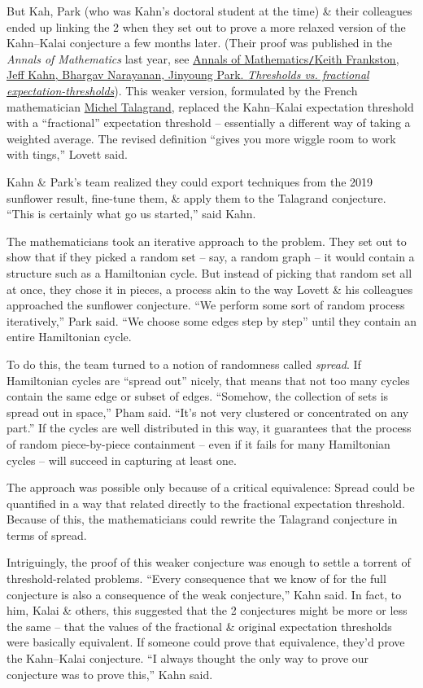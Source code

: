 \documentclass[oneside]{book}
\numberwithin{equation}{section}
\begin{document}
But Kah, Park (who was Kahn's doctoral student at the time) \& their colleagues ended up linking the 2 when they set out to prove a more relaxed version of the Kahn--Kalai conjecture a few months later. (Their proof was published in the \textit{Annals of Mathematics} last year, see \href{https://annals.math.princeton.edu/2021/194-2/p02}{Annals of Mathematics\texttt{/}Keith Frankston, Jeff Kahn, Bhargav Narayanan, Jinyoung Park. \textit{Thresholds vs. fractional expectation-thresholds}}). This weaker version, formulated by the French mathematician \href{https://michel.talagrand.net/}{Michel Talagrand}, replaced the Kahn--Kalai expectation threshold with a ``fractional'' expectation threshold -- essentially a different way of taking a weighted average. The revised definition ``gives you more wiggle room to work with tings,'' Lovett said.

Kahn \& Park's team realized they could export techniques from the 2019 sunflower result, fine-tune them, \& apply them to the Talagrand conjecture. ``This is certainly what go us started,'' said Kahn.

The mathematicians took an iterative approach to the problem. They set out to show that if they picked a random set -- say, a random graph -- it would contain a structure such as a Hamiltonian cycle. But instead of picking that random set all at once, they chose it in pieces, a process akin to the way Lovett \& his colleagues approached the sunflower conjecture. ``We perform some sort of random process iteratively,'' Park said. ``We choose some edges step by step'' until they contain an entire Hamiltonian cycle.

To do this, the team turned to a notion of randomness called \textit{spread}. If Hamiltonian cycles are ``spread out'' nicely, that means that not too many cycles contain the same edge or subset of edges. ``Somehow, the collection of sets is spread out in space,'' Pham said. ``It's not very clustered or concentrated on any part.'' If the cycles are well distributed in this way, it guarantees that the process of random piece-by-piece containment -- even if it fails for many Hamiltonian cycles -- will succeed in capturing at least one.

The approach was possible only because of a critical equivalence: Spread could be quantified in a way that related directly to the fractional expectation threshold. Because of this, the mathematicians could rewrite the Talagrand conjecture in terms of spread.

Intriguingly, the proof of this weaker conjecture was enough to settle a torrent of threshold-related problems. ``Every consequence that we know of for the full conjecture is also a consequence of the weak conjecture,'' Kahn said. In fact, to him, Kalai \& others, this suggested that the 2 conjectures might be more or less the same -- that the values of the fractional \& original expectation thresholds were basically equivalent. If someone could prove that equivalence, they'd prove the Kahn--Kalai conjecture. ``I always thought the only way to prove our conjecture was to prove this,'' Kahn said.
\end{document}
